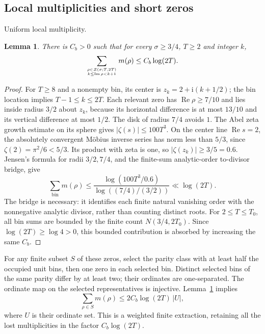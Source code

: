 \documentclass[11pt,a4paper]{article}
\numberwithin{equation}{section}
\newtheorem{lemma}[theorem]{Lemma}
\theoremstyle{definition}
\newcommand{\ii}{\mathrm i}
\newcommand{\Rea}{\operatorname{Re}}
\newcommand{\Ima}{\operatorname{Im}}
\begin{document}
\subsection{Local multiplicities and short zeros}
\par\medskip\noindent Uniform local multiplicity.
\begin{lemma}\label{lem:localzeros}
There is $C_b>0$ such that for every $\sigma\ge3/4$, $T\ge2$ and integer $k$,
\[
 \sum_{\rho\in\mathcal Z(\sigma;T,2T)\atop k\le\Ima\rho<k+1}m(\rho)
                  \le C_b\log(2T).
\]
\end{lemma}
\begin{proof}
For $T\ge8$ and a nonempty bin, its center is
$z_k=2+\ii(k+1/2)$; the bin location implies $T-1\le k\le2T$.
Each relevant zero has $\Rea\rho\ge7/10$ and lies inside radius $3/2$ about
$z_k$, because its horizontal difference is at most $13/10$ and its vertical
difference at most $1/2$.
The disk of radius $7/4$ avoids $1$. The Abel zeta growth estimate on its
sphere gives $|\zeta(s)|\le100T^3$.
On the center line $\Rea s=2$, the absolutely convergent M\"obius inverse
series has norm less than $5/3$, since $\zeta(2)=\pi^2/6<5/3$.
Its product with zeta is one, so $|\zeta(z_k)|\ge3/5=0.6$.
Jensen's formula for radii $3/2,7/4$, and the finite-sum analytic-order
to-divisor bridge, give
\[
 \sum_{\text{bin}}m(\rho)
 \le\frac{\log(100T^3/0.6)}{\log((7/4)/(3/2))}\ll\log(2T).
\]
The bridge is necessary: it identifies each finite natural vanishing order
with the nonnegative analytic divisor, rather than counting distinct roots.
For $2\le T\le T_0$, all bin sums are bounded by the finite count
$N(3/4,2T_0)$. Since $\log(2T)\ge\log4>0$, this bounded contribution is
absorbed by increasing the same $C_b$.
\end{proof}

For any finite subset $S$ of these zeros, select the parity class with at
least half the occupied unit bins, then one zero in each selected bin.
Distinct selected bins of the same parity differ by at least two; their
ordinates are one-separated. The ordinate map on the selected representatives
is injective. Lemma~\ref{lem:localzeros} implies
\begin{equation}\label{eq:weightedextract}
 \sum_{\rho\in S}m(\rho)\le2C_b\log(2T)\,|U|,
\end{equation}
where $U$ is their ordinate set. This is a weighted finite extraction, retaining
all the lost multiplicities in the factor $C_b\log(2T)$.
\end{document}
